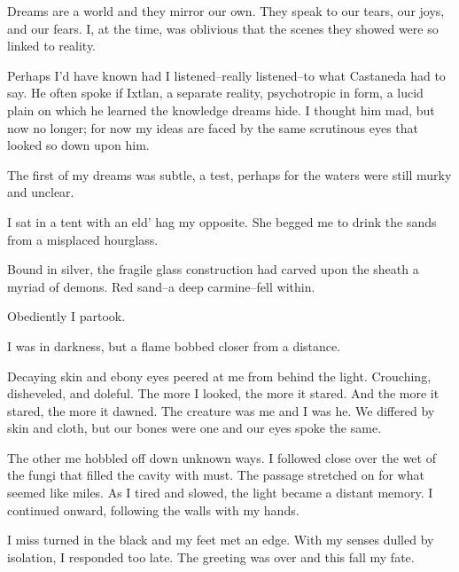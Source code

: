 \documentclass{article}
\begin{document}
\noindent
Dreams are a world and they mirror our own.
They speak to our tears, our joys, and our fears.
I, at the time, was oblivious that the scenes they
showed were so linked to reality.


Perhaps I'd have known had I listened--really listened--to
what Castaneda had to say.
He often spoke if Ixtlan,
a separate reality,
psychotropic in form,
a lucid plain on which he learned the knowledge dreams hide.
I thought him mad, but now no longer;
for now my ideas are faced by the same scrutinous eyes
that looked so down upon him.
\VV


\noindent
The first of my dreams was subtle, a test, perhaps
for the waters were still murky and unclear.
\VV


\noindent
I sat in a tent with an eld' hag my opposite.
She begged me to drink the sands from a misplaced hourglass.


Bound in silver, the fragile glass construction had
carved upon the sheath a myriad of demons.
Red sand--a deep carmine--fell within.


Obediently I partook.


\noindent
I was in darkness, but a flame bobbed closer from a distance.


Decaying skin and ebony eyes peered at me from behind the light.
Crouching, disheveled, and doleful.
The more I looked, the more it stared.
And the more it stared, the more it dawned.
The creature was me and I was he.
We differed by skin and cloth, but our bones were one
and our eyes spoke the same.


The other me hobbled off down unknown ways.
I followed close over the wet of the fungi that
filled the cavity with must.
The passage stretched on for what seemed like miles.
As I tired and slowed, the light became a distant memory.
I continued onward, following the walls with my hands.


I miss turned in the black and my feet met an edge.
With my senses dulled by isolation, I responded too late.
The greeting was over and this fall my fate.
\end{document}
